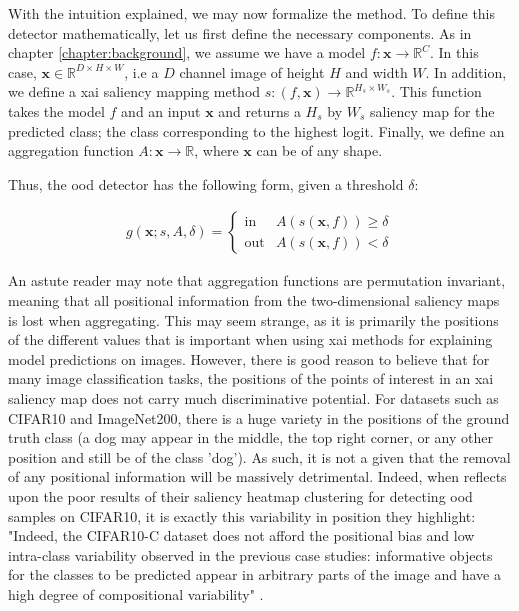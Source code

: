 \documentclass[UKenglish]{uiomasterthesis} %
\newcommand{\R}{\mathbb{R}}
\theoremstyle{definition}
\begin{document}
With the intuition explained, we may now formalize the method. To define this detector mathematically, let us first define the necessary components. As in chapter \ref{chapter:background}, we assume we have a model $f: \bm{x} \to \R^C$. In this case, $\bm{x} \in \R^{D \times H \times W}$, i.e a $D$ channel image of height $H$ and width $W$. In addition, we define a \ac{xai} saliency mapping method $s: (f, \bm{x}) \to \R^{H_s \times W_s}$. This function takes the model $f$ and an input $\bm{x}$ and returns a $H_s$ by $W_s$ saliency map for the predicted class; the class corresponding to the highest logit. Finally, we define an aggregation function $A: \bm{x} \rightarrow \R$, where $\bm{x}$ can be of any shape.

Thus, the \ac{ood} detector has the following form, given a threshold $\delta$:

\begin{align}
    g(\bm{x}; s, A, \delta)=\begin{cases} 
        \text{in } & A(s(\bm{x}, f)) \ge \delta \\
        \text{out} & A(s(\bm{x}, f)) < \delta 
   \end{cases}
\label{eq:aggregate}
\end{align}

An astute reader may note that aggregation functions are permutation invariant, meaning that all positional information from the two-dimensional saliency maps is lost when aggregating. This may seem strange, as it is primarily the positions of the different values that is important when using \ac{xai} methods for explaining model predictions on images. However, there is good reason to believe that for many image classification tasks, the positions of the points of interest in an \ac{xai} saliency map does not carry much discriminative potential. For datasets such as CIFAR10 and ImageNet200, there is a huge variety in the positions of the ground truth class (a dog may appear in the middle, the top right corner, or any other position and still be of the class 'dog'). As such, it is not a given that the removal of any positional information will be massively detrimental. Indeed, when \cite{martinez} reflects upon the poor results of their saliency heatmap clustering for detecting \ac{ood} samples on CIFAR10, it is exactly this variability in position they highlight: "Indeed, the CIFAR10-C dataset does not afford the positional bias and low intra-class variability observed in the previous case studies: informative objects for the classes to be predicted appear in arbitrary parts of the image and have a high degree of compositional variability" \cite{martinez}.
\end{document}
